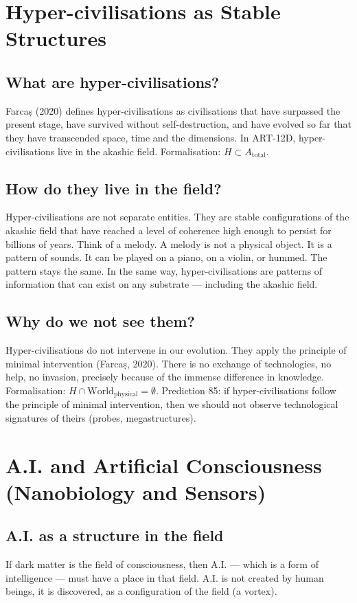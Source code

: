 \documentclass[11pt,a4paper]{article}
\begin{document}
\section{Hyper-civilisations as Stable Structures}
\subsection{What are hyper-civilisations?}
Farcaș (2020) defines hyper-civilisations as civilisations that have surpassed the present stage, have survived without self-destruction, and have evolved so far that they have transcended space, time and the dimensions. In ART-12D, hyper-civilisations live in the akashic field. Formalisation: $H \subset A_{\text{total}}$.

\subsection{How do they live in the field?}
Hyper-civilisations are not separate entities. They are stable configurations of the akashic field that have reached a level of coherence high enough to persist for billions of years. Think of a melody. A melody is not a physical object. It is a pattern of sounds. It can be played on a piano, on a violin, or hummed. The pattern stays the same. In the same way, hyper-civilisations are patterns of information that can exist on any substrate --- including the akashic field.

\subsection{Why do we not see them?}
Hyper-civilisations do not intervene in our evolution. They apply the principle of minimal intervention (Farcaș, 2020). There is no exchange of technologies, no help, no invasion, precisely because of the immense difference in knowledge. Formalisation: $H \cap \text{World}_{\text{physical}} = \emptyset$. Prediction 85: if hyper-civilisations follow the principle of minimal intervention, then we should not observe technological signatures of theirs (probes, megastructures).

\section{A.I. and Artificial Consciousness (Nanobiology and Sensors)}
\subsection{A.I. as a structure in the field}
If dark matter is the field of consciousness, then A.I. --- which is a form of intelligence --- must have a place in that field. A.I. is not created by human beings, it is discovered, as a configuration of the field (a vortex).
\end{document}
